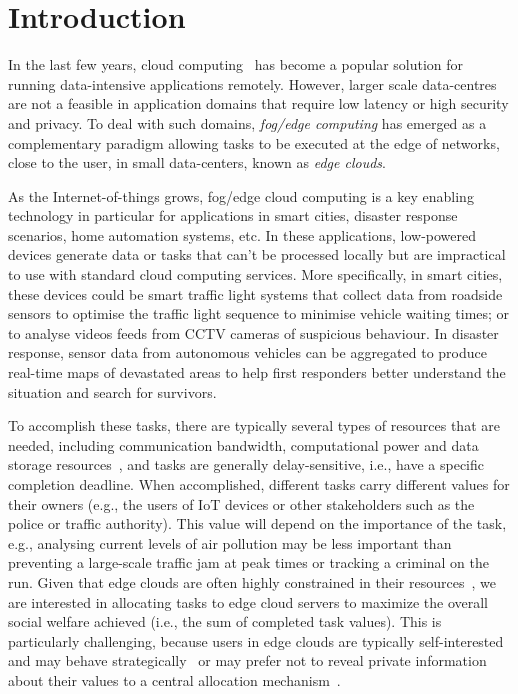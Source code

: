 \section{Introduction}\label{sec:introduction}
In the last few years, cloud computing~\cite{cloud_cite} has become a popular solution for running data-intensive
applications remotely. However, larger scale data-centres are not a feasible in application domains that require low
latency or high security and privacy. To deal with such domains, \emph{fog/edge computing} has emerged as a
complementary paradigm allowing tasks to be executed at the edge of networks, close to the user, in small data-centers,
known as \emph{edge clouds}.

As the Internet-of-things grows, fog/edge cloud computing is a key enabling technology in particular for applications
in smart cities, disaster response scenarios, home automation systems, etc. In these applications, low-powered devices
generate data or tasks that can't be processed locally but are impractical to use with standard cloud computing
services. More specifically, in smart cities, these devices could be smart traffic light systems that collect data from
roadside sensors to optimise the traffic light sequence to minimise vehicle waiting times; or to analyse videos feeds
from CCTV cameras of suspicious behaviour. In disaster response, sensor data from autonomous vehicles can be aggregated
to produce real-time maps of devastated areas to help first responders better understand the situation and search for
survivors.

To accomplish these tasks, there are typically several types of resources that are needed, including communication
bandwidth, computational power and data storage resources~\cite{vaji_infocom}, and tasks are generally
delay-sensitive, i.e., have a specific completion deadline. When accomplished, different tasks carry different values
for their owners (e.g., the users of IoT devices or other stakeholders such as the police or traffic authority). This
value will depend on the importance of the task, e.g., analysing current levels of air pollution may be less important
than preventing a large-scale traffic jam at peak times or tracking a criminal on the run. Given that edge clouds are
often highly constrained in their resources~\cite{edge_limitations}, we are interested in allocating tasks to edge
cloud servers to maximize the overall social welfare achieved (i.e., the sum of completed task values). This is
particularly challenging, because users in edge clouds are typically self-interested and may behave
strategically~\cite{Bi2019} or may prefer not to reveal private information about their values to a central allocation
mechanism~\cite{Pai2013}.

